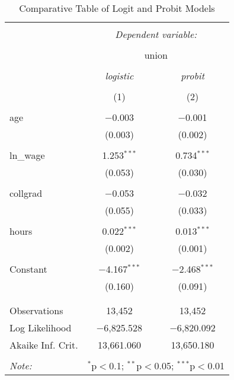 
\begin{table}[!htbp] \centering 
  \caption{Comparative Table of Logit and Probit Models} 
  \label{} 
\begin{tabular}{@{\extracolsep{5pt}}lcc} 
\\[-1.8ex]\hline 
\hline \\[-1.8ex] 
 & \multicolumn{2}{c}{\textit{Dependent variable:}} \\ 
\cline{2-3} 
\\[-1.8ex] & \multicolumn{2}{c}{union} \\ 
\\[-1.8ex] & \textit{logistic} & \textit{probit} \\ 
\\[-1.8ex] & (1) & (2)\\ 
\hline \\[-1.8ex] 
 age & $-$0.003 & $-$0.001 \\ 
  & (0.003) & (0.002) \\ 
  & & \\ 
 ln\_wage & 1.253$^{***}$ & 0.734$^{***}$ \\ 
  & (0.053) & (0.030) \\ 
  & & \\ 
 collgrad & $-$0.053 & $-$0.032 \\ 
  & (0.055) & (0.033) \\ 
  & & \\ 
 hours & 0.022$^{***}$ & 0.013$^{***}$ \\ 
  & (0.002) & (0.001) \\ 
  & & \\ 
 Constant & $-$4.167$^{***}$ & $-$2.468$^{***}$ \\ 
  & (0.160) & (0.091) \\ 
  & & \\ 
\hline \\[-1.8ex] 
Observations & 13,452 & 13,452 \\ 
Log Likelihood & $-$6,825.528 & $-$6,820.092 \\ 
Akaike Inf. Crit. & 13,661.060 & 13,650.180 \\ 
\hline 
\hline \\[-1.8ex] 
\textit{Note:}  & \multicolumn{2}{r}{$^{*}$p$<$0.1; $^{**}$p$<$0.05; $^{***}$p$<$0.01} \\ 
\end{tabular} 
\end{table} 
